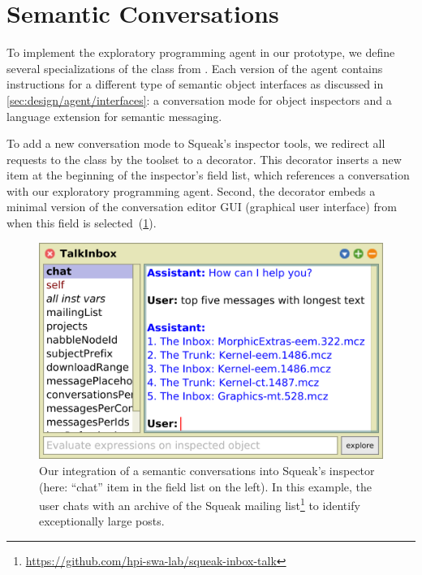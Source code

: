 
\section{Semantic Conversations}
\label{sec:implementation/conversations}

To implement the exploratory programming agent in our prototype, we define several specializations of the  class from \semtex.
Each version of the agent contains instructions for a different type of semantic object interfaces as discussed in \cref{sec:design/agent/interfaces}: a conversation mode for object inspectors and a language extension for semantic messaging.

To add a new conversation mode to Squeak's inspector tools, we redirect all requests to the  class by the toolset to a decorator.
This decorator inserts a new  item at the beginning of the inspector's field list, which references a conversation with our exploratory programming agent.
Second, the decorator embeds a minimal version of the conversation editor GUI (graphical user interface) from \semtex when this field is selected~(\cref{fig:implementation/conversations/inspector}).

\begin{figure}
	\begin{minipage}{\textwidth}
		\centering
		\includegraphics[width=.7\textwidth]{03_conversations/inspector.png}
		\caption[Our integration of semantic conversations into Squeak's inspector.]{
			Our integration of a semantic conversations into Squeak's inspector (here: ``chat'' item in the field list on the left).
			In this example, the user chats with an archive of the Squeak mailing list\footnote{\url{https://github.com/hpi-swa-lab/squeak-inbox-talk}} to identify exceptionally large posts.
		}
		\label{fig:implementation/conversations/inspector}
	\end{minipage}
\end{figure}

